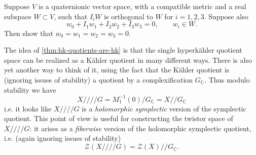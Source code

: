 \documentclass[12pt,letterpaper,reqno]{article}
\numberwithin{equation}{section}
\newcommand{\cZ}{\ensuremath{\mathcal Z}}
\newcommand{\C}{\ensuremath{\mathbb C}}
\newcommand{\kahler}{K\"ahler\xspace}
\newcommand{\kq}{/\!\!/}
\newcommand{\hk}{hyperk\"ahler\xspace}
\newcommand{\hkq}{/\!\!/\!\!/\!\!/}
\newcommand{\ti}[1]{\textit{#1}}
\begin{document}
\begin{exercise} \label{exc:quat-linear-indep}
Suppose $V$ is a quaternionic vector space, with a compatible metric
and a real subspace $W \subset V$, such that
$I_i W$ is orthogonal to $W$ for $i = 1,2,3$.
Suppose also
\begin{equation}
 w_0 + I_1 w_1 + I_2 w_2 + I_3 w_3 = 0, \qquad w_i \in W.
\end{equation}
Then show that $w_0 = w_1 = w_2 = w_3 = 0$.
\end{exercise}

The idea of \autoref{thm:hk-quotients-are-hk} is
that the single \hk quotient space can be realized as a \kahler
quotient in many different ways. There is also yet another way to think of
it, using the fact that the \kahler quotient is (ignoring issues of stability)
a quotient by a complexification $G_\C$. Thus modulo stability we have
\begin{equation}
  X \hkq G = M_1^{-1}(0) / G_\C = X \kq G_\C
\end{equation}
i.e. it looks like $X \hkq G$ is a \ti{holomorphic symplectic} version
of the symplectic quotient. This point of view is useful for
constructing the twistor space of $X \hkq G$: it arises
as a \ti{fiberwise} version of the holomorphic symplectic quotient,
i.e. (again ignoring issues of stability)
\begin{equation}
  \cZ(X \hkq G) = \cZ(X) \kq G_\C.
\end{equation}
\end{document}

